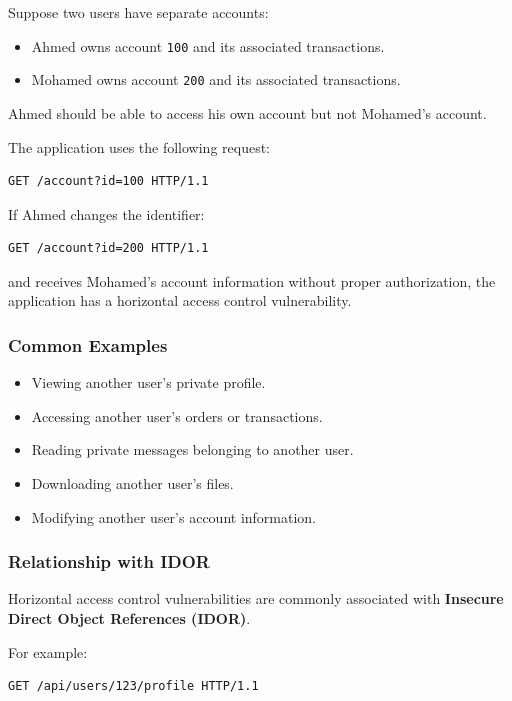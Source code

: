 \documentclass[11pt,a4paper]{article}
\begin{document}
Suppose two users have separate accounts:
\begin{itemize}
    \item Ahmed owns account \texttt{100} and its associated transactions.
    \item Mohamed owns account \texttt{200} and its associated transactions.
\end{itemize}

Ahmed should be able to access his own account but not Mohamed's account.

The application uses the following request:
\begin{lstlisting}[language=HTTP]
GET /account?id=100 HTTP/1.1
\end{lstlisting}

If Ahmed changes the identifier:
\begin{lstlisting}[language=HTTP]
GET /account?id=200 HTTP/1.1
\end{lstlisting}

and receives Mohamed's account information without proper authorization, the application has a horizontal access control vulnerability.

\subsubsection{Common Examples}

\begin{itemize}
    \item Viewing another user's private profile.
    \item Accessing another user's orders or transactions.
    \item Reading private messages belonging to another user.
    \item Downloading another user's files.
    \item Modifying another user's account information.
\end{itemize}

\subsubsection{Relationship with IDOR}

Horizontal access control vulnerabilities are commonly associated with \textbf{Insecure Direct Object References (IDOR)}.

For example:
\begin{lstlisting}[language=HTTP]
GET /api/users/123/profile HTTP/1.1
\end{lstlisting}
\end{document}
